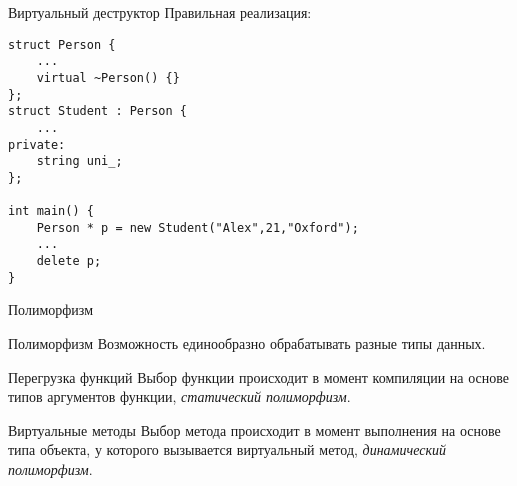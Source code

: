 \documentclass{beamer}
\begin{document}
\begin{frame}[fragile]{Виртуальный деструктор}
Правильная реализация:
    \begin{lstlisting}
struct Person {
    ...
    virtual ~Person() {}
};
struct Student : Person {
    ...
private:
    string uni_;
};

int main() {
    Person * p = new Student("Alex",21,"Oxford");
    ...
    delete p;
}
    \end{lstlisting}
\end{frame}

\begin{frame}[fragile]{Полиморфизм}
    \begin{block}{Полиморфизм} 
        Возможность единообразно обрабатывать разные типы данных.
    \end{block}

    \begin{block}{Перегрузка функций}
        Выбор функции происходит в момент компиляции на основе типов аргументов
        функции, {\em статический полиморфизм}.
    \end{block}
               
    \begin{block}{Виртуальные методы}
        Выбор метода происходит в момент выполнения на основе типа объекта, у
        которого вызывается виртуальный метод, {\em динамический полиморфизм}. 
    \end{block}
\end{frame}
\end{document}
